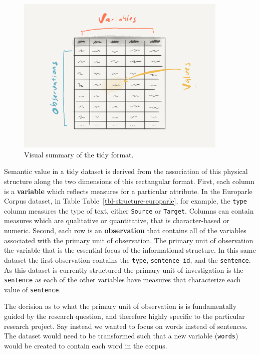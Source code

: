 \documentclass[
  letterpaper,
]{latex/krantz}
\begin{document}
\begin{figure}[h]

{\centering \includegraphics[width=0.9\textwidth,height=\textheight]{./figures/understanding-data/tidy-format-paper.png}

}

\caption{\label{fig-tidy-format-image}Visual summary of the tidy
format.}

\end{figure}

Semantic value in a tidy dataset is derived from the association of this
physical structure along the two dimensions of this rectangular format.
First, each column is a \textbf{variable} which reflects measures for a
particular attribute. In the Europarle Corpus dataset, in Table
Table~\ref{tbl-structure-europarle}, for example, the \texttt{type}
column measures the type of text, either \texttt{Source} or
\texttt{Target}. Columns can contain measures which are qualitative or
quantitative, that is character-based or numeric. Second, each row is an
\textbf{observation} that contains all of the variables associated with
the primary unit of observation. The primary unit of observation the
variable that is the essential focus of the informational structure. In
this same dataset the first observation contains the \texttt{type},
\texttt{sentence\_id}, and the \texttt{sentence}. As this dataset is
currently structured the primary unit of investigation is the
\texttt{sentence} as each of the other variables have measures that
characterize each value of \texttt{sentence}.

The decision as to what the primary unit of observation is is
fundamentally guided by the research question, and therefore highly
specific to the particular research project. Say instead we wanted to
focus on words instead of sentences. The dataset would need to be
transformed such that a new variable (\texttt{words}) would be created
to contain each word in the corpus.
\end{document}
